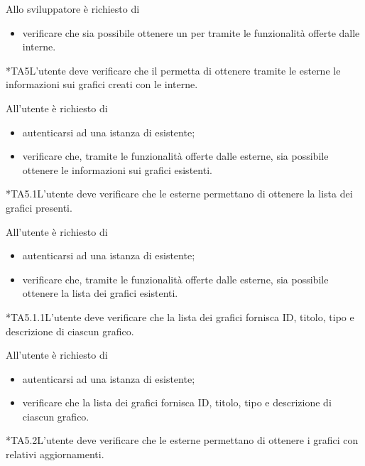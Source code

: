 		Allo sviluppatore è richiesto di
		\begin{itemize}
			\item verificare che sia possibile ottenere un  per  tramite le funzionalità offerte dalle  interne.
		\end{itemize}

	*{TA5}L'utente  deve verificare che il  permetta di ottenere tramite le  esterne le informazioni sui grafici creati con le  interne.

		All'utente  è richiesto di
		\begin{itemize}
			\item autenticarsi ad una istanza di \projectname{} esistente;
			\item verificare che, tramite le funzionalità offerte dalle  esterne, sia possibile ottenere le informazioni sui grafici esistenti.
		\end{itemize}

	*{TA5.1}L'utente  deve verificare che le  esterne permettano di ottenere la lista dei grafici presenti.

		All'utente  è richiesto di
		\begin{itemize}
			\item autenticarsi ad una istanza di \projectname{} esistente;
			\item verificare che, tramite le funzionalità offerte dalle  esterne, sia possibile ottenere la lista dei grafici esistenti.
		\end{itemize}

	*{TA5.1.1}L'utente  deve verificare che la lista dei grafici fornisca ID, titolo, tipo e descrizione di ciascun grafico.
		
		All'utente  è richiesto di
		\begin{itemize}
			\item autenticarsi ad una istanza di \projectname{} esistente;
			\item verificare che la lista dei grafici fornisca ID, titolo, tipo e descrizione di ciascun grafico.
		\end{itemize}

	*{TA5.2}L'utente  deve verificare che le  esterne permettano di ottenere i grafici con relativi aggiornamenti.
		
